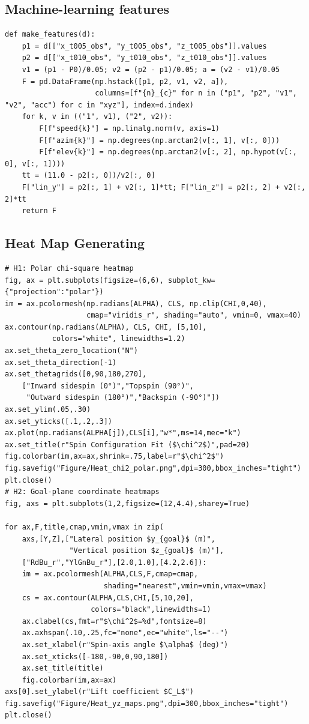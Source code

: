 \subsection*{Machine-learning features}
\begin{lstlisting}[style=mypython,basicstyle=\ttfamily\scriptsize]
def make_features(d):
    p1 = d[["x_t005_obs", "y_t005_obs", "z_t005_obs"]].values
    p2 = d[["x_t010_obs", "y_t010_obs", "z_t010_obs"]].values
    v1 = (p1 - P0)/0.05; v2 = (p2 - p1)/0.05; a = (v2 - v1)/0.05
    F = pd.DataFrame(np.hstack([p1, p2, v1, v2, a]),
                     columns=[f"{n}_{c}" for n in ("p1", "p2", "v1", "v2", "acc") for c in "xyz"], index=d.index)
    for k, v in (("1", v1), ("2", v2)):
        F[f"speed{k}"] = np.linalg.norm(v, axis=1)
        F[f"azim{k}"] = np.degrees(np.arctan2(v[:, 1], v[:, 0]))
        F[f"elev{k}"] = np.degrees(np.arctan2(v[:, 2], np.hypot(v[:, 0], v[:, 1])))
    tt = (11.0 - p2[:, 0])/v2[:, 0]
    F["lin_y"] = p2[:, 1] + v2[:, 1]*tt; F["lin_z"] = p2[:, 2] + v2[:, 2]*tt
    return F
\end{lstlisting}

\subsection*{Heat Map Generating}
\begin{lstlisting}[style=mypython,basicstyle=\ttfamily\scriptsize]
# H1: Polar chi-square heatmap
fig, ax = plt.subplots(figsize=(6,6), subplot_kw={"projection":"polar"})
im = ax.pcolormesh(np.radians(ALPHA), CLS, np.clip(CHI,0,40),
                   cmap="viridis_r", shading="auto", vmin=0, vmax=40)
ax.contour(np.radians(ALPHA), CLS, CHI, [5,10],
           colors="white", linewidths=1.2)
ax.set_theta_zero_location("N")
ax.set_theta_direction(-1)
ax.set_thetagrids([0,90,180,270],
    ["Inward sidespin (0°)","Topspin (90°)",
     "Outward sidespin (180°)","Backspin (-90°)"])
ax.set_ylim(.05,.30)
ax.set_yticks([.1,.2,.3])
ax.plot(np.radians(ALPHA[j]),CLS[i],"w*",ms=14,mec="k")
ax.set_title(r"Spin Configuration Fit ($\chi^2$)",pad=20)
fig.colorbar(im,ax=ax,shrink=.75,label=r"$\chi^2$")
fig.savefig("Figure/Heat_chi2_polar.png",dpi=300,bbox_inches="tight")
plt.close()
# H2: Goal-plane coordinate heatmaps
fig, axs = plt.subplots(1,2,figsize=(12,4.4),sharey=True)

for ax,F,title,cmap,vmin,vmax in zip(
    axs,[Y,Z],["Lateral position $y_{goal}$ (m)",
               "Vertical position $z_{goal}$ (m)"],
    ["RdBu_r","YlGnBu_r"],[2.0,1.0],[4.2,2.6]):
    im = ax.pcolormesh(ALPHA,CLS,F,cmap=cmap,
                       shading="nearest",vmin=vmin,vmax=vmax)
    cs = ax.contour(ALPHA,CLS,CHI,[5,10,20],
                    colors="black",linewidths=1)
    ax.clabel(cs,fmt=r"$\chi^2$=%d",fontsize=8)
    ax.axhspan(.10,.25,fc="none",ec="white",ls="--")
    ax.set_xlabel(r"Spin-axis angle $\alpha$ (deg)")
    ax.set_xticks([-180,-90,0,90,180])
    ax.set_title(title)
    fig.colorbar(im,ax=ax)
axs[0].set_ylabel(r"Lift coefficient $C_L$")
fig.savefig("Figure/Heat_yz_maps.png",dpi=300,bbox_inches="tight")
plt.close()
\end{lstlisting}
